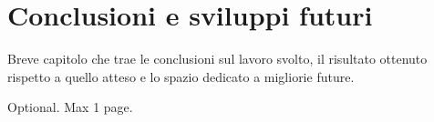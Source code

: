 \documentclass[12pt,a4paper,openright,twoside]{book}
\begin{document}
\chapter{Conclusioni e sviluppi futuri}

Breve capitolo che trae le conclusioni sul lavoro svolto, il risultato ottenuto rispetto a quello atteso e lo spazio dedicato a migliorie future.

%
%

\backmatter

\nocite{*} %




\begin{acknowledgements} %
    Optional. Max 1 page.
\end{acknowledgements}
\end{document}
